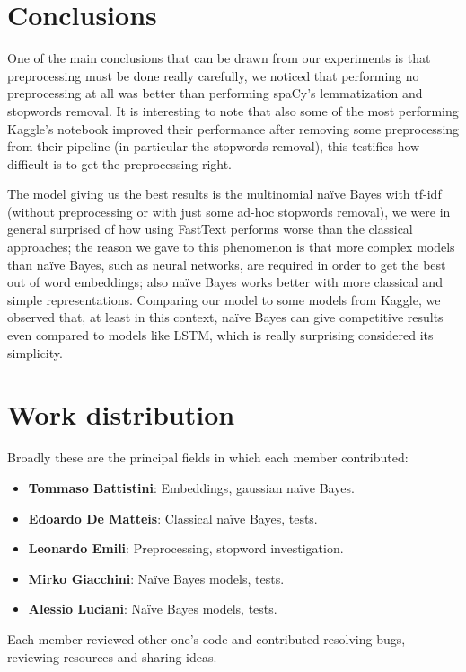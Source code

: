 \documentclass{article}
\begin{document}
    \section*{Conclusions}
    One of the main conclusions that can be drawn from our experiments is that preprocessing must be done really carefully, we noticed that performing no preprocessing at all was better than performing spaCy's lemmatization and stopwords removal. 
    It is interesting to note that also some of the most performing Kaggle's notebook improved their performance after removing some preprocessing from their pipeline (in particular the stopwords removal), this testifies how difficult is to get the preprocessing right.
    
    The model giving us the best results is the multinomial na\"ive Bayes with tf-idf (without preprocessing or with just some ad-hoc stopwords removal), we were in general surprised of how using FastText performs worse than the classical approaches; the reason we gave to this phenomenon is that  more complex models than na\"ive Bayes, such as neural networks, are required in order to get the best out of word embeddings; also na\"ive Bayes works better with more classical and simple representations. 
    Comparing our model to some models from Kaggle, we observed that, at least in this context, na\"ive Bayes can give competitive results even compared to models like LSTM, which is really surprising considered its simplicity.

    \section*{Work distribution}
    Broadly these are the principal fields in which each member contributed:

    \begin{itemize}
        \item \textbf{Tommaso Battistini}: Embeddings, gaussian na\"ive Bayes.
        \item \textbf{Edoardo De Matteis}: Classical na\"ive Bayes, tests.
        \item \textbf{Leonardo Emili}: Preprocessing, stopword investigation.
        \item \textbf{Mirko Giacchini}: Na\"ive Bayes models, tests.
        \item \textbf{Alessio Luciani}: Na\"ive Bayes models, tests.
    \end{itemize}

    Each member reviewed other one's code and contributed resolving bugs, reviewing resources and sharing ideas. 

    {}
    
\end{document}
